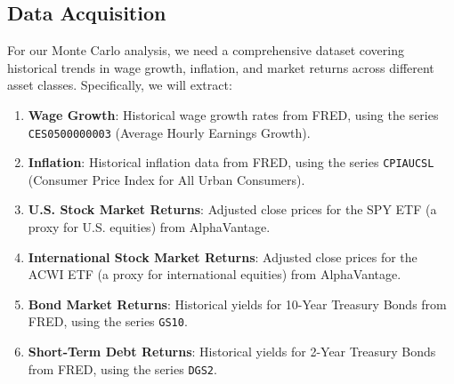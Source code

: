 \documentclass[
  letterpaper,
  DIV=11,
  numbers=noendperiod]{scrartcl}
\begin{document}
\subsection{Data Acquisition}\label{data-acquisition}

For our Monte Carlo analysis, we need a comprehensive dataset covering
historical trends in wage growth, inflation, and market returns across
different asset classes. Specifically, we will extract:

\begin{enumerate}
\def\labelenumi{\arabic{enumi}.}
\item
  \textbf{Wage Growth}: Historical wage growth rates from FRED, using
  the series \texttt{CES0500000003} (Average Hourly Earnings Growth).
\item
  \textbf{Inflation}: Historical inflation data from FRED, using the
  series \texttt{CPIAUCSL} (Consumer Price Index for All Urban
  Consumers).
\item
  \textbf{U.S. Stock Market Returns}: Adjusted close prices for the SPY
  ETF (a proxy for U.S. equities) from AlphaVantage.
\item
  \textbf{International Stock Market Returns}: Adjusted close prices for
  the ACWI ETF (a proxy for international equities) from AlphaVantage.
\item
  \textbf{Bond Market Returns}: Historical yields for 10-Year Treasury
  Bonds from FRED, using the series \texttt{GS10}.
\item
  \textbf{Short-Term Debt Returns}: Historical yields for 2-Year
  Treasury Bonds from FRED, using the series \texttt{DGS2}.
\end{enumerate}
\end{document}
